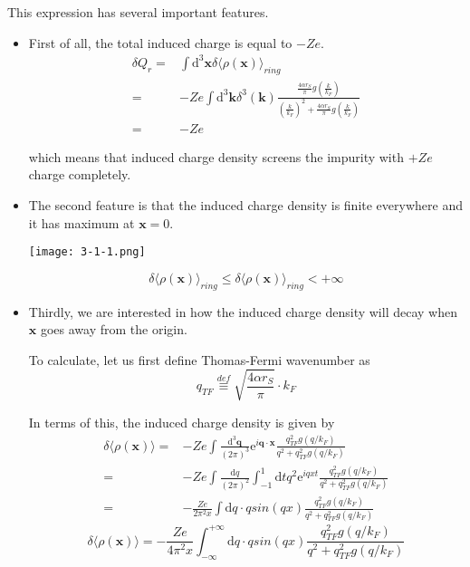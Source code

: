 This expression has several important features.
\begin{itemize}
\item First of all, the total induced charge is equal to $-Z e$.
\begin{equation} \label{Eqs3.1.25} \begin{split}
\delta Q_r =& \int \mathrm{d}^3 \mathbf{x} \delta \langle \rho(\mathbf{x}) \rangle_{ring}\\
=& -Z e \int \mathrm{d}^3 \mathbf{k} \delta^3(\mathbf{k})\frac{\frac{4\alpha r_S}{\pi}g\left( \frac{k}{k_F} \right)}{\left( \frac{k}{k_F} \right)^2+\frac{4\alpha r_S}{\pi}g\left( \frac{k}{k_F} \right)}\\
=& -Z e
\end{split}\end{equation}

which means that induced charge density screens the impurity with $+Z e$ charge completely.

\item The second feature is that the induced charge density is finite everywhere and it has maximum at $\mathbf{x}=0$.

\begin{center} \label{Fig3.1.1}
\texttt{[image: 3-1-1.png]}
\end{center}

\begin{equation}\label{Eqs3.1.26}
\delta \langle \rho(\mathbf{x}) \rangle_{ring} \leq \delta \langle \rho(\mathbf{x}) \rangle_{ring} < +\infty
\end{equation}

\item Thirdly, we are interested in how the induced charge density will decay when $\mathbf{x}$ goes away from the origin.

To calculate, let us first define Thomas-Fermi wavenumber as
\begin{equation} \label{Eqs3.1.27}
q_{TF} \overset{def}{\equiv} \sqrt{\frac{4\alpha r_S}{\pi}} \cdot k_F
\end{equation}

In terms of this, the induced charge density is given by
\[\begin{split} \delta \langle \rho(\mathbf{x}) \rangle =& -Z e \int \frac{\mathrm{d}^3 \mathbf{q}}{(2\pi)^3} \mathrm{e}^{i \mathbf{q}\cdot\mathbf{x}} \frac{q_{TF}^2 g(q/k_F)}{q^2 + q_{TF}^2 g(q/k_F)}\\
=& -Z e \int \frac{\mathrm{d} q}{(2\pi)^2} \int_{-1}^{1} \mathrm{d} t q^2 \mathrm{e}^{i q x t} \frac{q_{TF}^2 g(q/k_F)}{q^2 + q_{TF}^2 g(q/k_F)}\\
=&-\frac{Z e}{2\pi^2 x} \int \mathrm{d} q \cdot q sin (qx)\frac{q_{TF}^2 g(q/k_F)}{q^2 + q_{TF}^2 g(q/k_F)}
\end{split} \]
\begin{equation} \label{Eqs3.1.28}
\delta \langle \rho(\mathbf{x}) \rangle = -\frac{Z e}{4\pi^2 x} \int_{-\infty}^{+\infty} \mathrm{d} q \cdot q sin(qx) \frac{q_{TF}^2 g(q/k_F)}{q^2 + q_{TF}^2 g(q/k_F)}
\end{equation}


\end{itemize}
